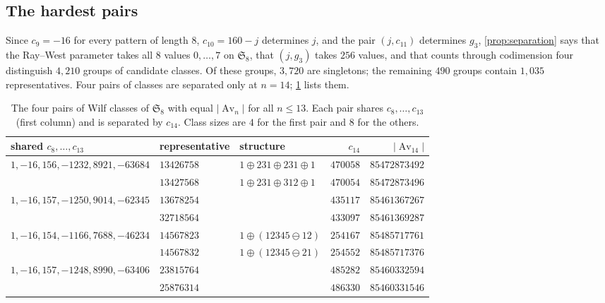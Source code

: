 \documentclass[11pt,reqno]{amsart}
\theoremstyle{plain}
\theoremstyle{definition}
\theoremstyle{remark}
\newcommand{\Av}{\operatorname{Av}}
\newcommand{\Sym}{\mathfrak{S}}
\begin{document}
\begin{enumerate}
\end{enumerate}

\subsection{The hardest pairs}\label{sec:hardest}
Since $c_9=-16$ for every pattern of length $8$, $c_{10}=160-j$ determines $j$, and the pair $(j,c_{11})$ determines $g_3$, \cref{prop:separation} says that the Ray--West parameter takes all $8$ values $0,\dots,7$ on $\Sym_8$, that $(j,g_3)$ takes $256$ values, and that counts through codimension four distinguish $4{,}210$
groups of candidate classes. Of these groups, $3{,}720$ are singletons;
the remaining $490$ groups contain $1{,}035$ representatives. Four pairs of classes are separated only at $n=14$; \cref{tab:hardest} lists them.

\begin{table}[ht]
\centering\small
\begin{tabular}{@{}lllrr@{}}
\toprule
shared $c_8,\dots,c_{13}$ & representative & structure & $c_{14}$ & $|\Av_{14}|$\\
\midrule
$1,-16,156,-1232,8921,-63684$ & $13426758$ & $1\oplus231\oplus231\oplus1$ & $470058$ & $85472873492$\\
 & $13427568$ & $1\oplus231\oplus312\oplus1$ & $470054$ & $85472873496$\\
\addlinespace
$1,-16,157,-1250,9014,-62345$ & $13678254$ & & $435117$ & $85461367267$\\
 & $32718564$ & & $433097$ & $85461369287$\\
\addlinespace
$1,-16,154,-1166,7688,-46234$ & $14567823$ & $1\oplus(12345\ominus12)$ & $254167$ & $85485717761$\\
 & $14567832$ & $1\oplus(12345\ominus21)$ & $254552$ & $85485717376$\\
\addlinespace
$1,-16,157,-1248,8990,-63406$ & $23815764$ & & $485282$ & $85460332594$\\
 & $25876314$ & & $486330$ & $85460331546$\\
\bottomrule
\end{tabular}
\smallskip
\caption{The four pairs of Wilf classes of $\Sym_8$ with equal $|\Av_n|$ for all $n\le13$. Each pair shares $c_8,\dots,c_{13}$ (first column) and is separated by $c_{14}$. Class sizes are $4$ for the first pair and $8$ for the others.}\label{tab:hardest}
\end{table}
\end{document}
